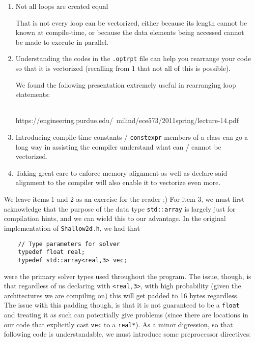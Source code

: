 \begin{enumerate}[1.]
    \item Not all loops are created equal

    That is not every loop can be vectorized, either because its length cannot be known at compile-time, or because the data elements being accessed cannot be made to execute in parallel.

    \item Understanding the codes in the \texttt{.optrpt} file can help you rearrange your code so that it is vectorized (recalling from 1 that not all of this is possible).

    We found the following presentation extremely useful in rearranging loop statements:\\\\ \centerline{https://engineering.purdue.edu/~milind/ece573/2011spring/lecture-14.pdf}

    \item Introducing compile-time constants / \texttt{constexpr} members of a class can go a long way in assisting the compiler understand what can / cannot be vectorized.

    \item Taking great care to enforce memory alignment as well as declare said alignment to the compiler will also enable it to vectorize even more.
\end{enumerate}

We leave items 1 and 2 as an exercise for the reader ;)  For item 3, we must first acknowledge that the purpose of the data type \texttt{std::array} is largely just for compilation hints, and we can wield this to our advantage.  In the original implementation of \texttt{Shallow2d.h}, we had that

{\tiny
\begin{lstlisting}
    // Type parameters for solver
    typedef float real;
    typedef std::array<real,3> vec;
\end{lstlisting}
}

were the primary solver types used throughout the program.  The issue, though, is that regardless of us declaring with \texttt{<real,3>}, with high probability (given the architectures we are compiling on) this will get padded to 16 bytes regardless.  The issue with this padding though, is that it is not guaranteed to be a \texttt{float} and treating it as such can potentially give problems (since there are locations in our code that explicitly cast \texttt{vec} to a \texttt{real*}).  As a minor digression, so that following code is understandable, we must introduce some preprocessor directives:

